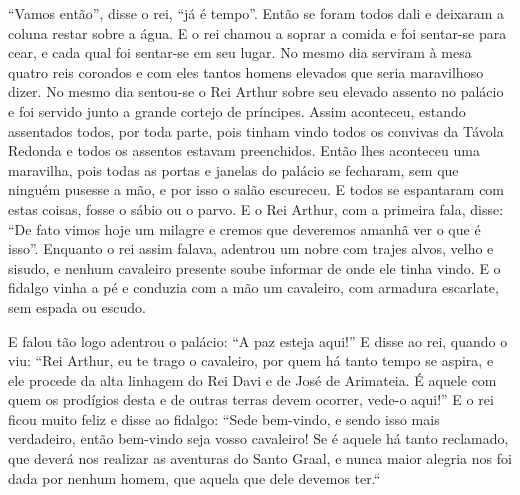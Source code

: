 “Vamos então”, disse o rei, “já é tempo”. Então se foram todos dali e deixaram a
coluna restar sobre a água. E o rei chamou a soprar a comida e foi sentar-se
para cear, e cada qual foi sentar-se em seu lugar. No mesmo dia serviram à mesa
quatro reis coroados e com eles tantos homens elevados que seria maravilhoso dizer.
No mesmo dia sentou-se o Rei Arthur sobre seu elevado assento no palácio e foi
servido junto a grande cortejo de príncipes. Assim aconteceu, estando
assentados todos, por toda parte, pois tinham vindo todos os convivas da Távola
Redonda e todos os assentos estavam preenchidos. Então lhes aconteceu uma
maravilha, pois todas as portas e janelas do palácio se fecharam, sem que
ninguém pusesse a mão, e por isso o salão escureceu. E todos se espantaram com
estas coisas, fosse o sábio ou o parvo. E o Rei Arthur, com a primeira fala,
disse: “De fato vimos hoje um milagre e cremos que deveremos amanhã ver o que é
isso”. Enquanto o rei assim falava, adentrou um nobre com trajes alvos, velho e
sisudo, e nenhum cavaleiro presente soube informar de onde ele tinha vindo. E o
fidalgo vinha a pé e conduzia com a mão um cavaleiro, com armadura escarlate,
sem espada ou escudo. 

E falou tão logo adentrou o palácio: “A paz esteja aqui!” E disse ao rei,
quando o viu: “Rei Arthur, eu te trago o cavaleiro, por quem há tanto tempo se
aspira, e ele procede da alta linhagem do Rei Davi e de José de Arimateia. É
aquele com quem os prodígios desta e de outras terras devem ocorrer, vede-o
aqui!” E o rei ficou muito feliz e disse ao fidalgo: “Sede bem-vindo, e sendo
isso mais verdadeiro, então bem-vindo seja vosso cavaleiro! Se é aquele há
tanto reclamado, que deverá nos realizar as aventuras do Santo Graal, e nunca
maior alegria nos foi dada por nenhum homem, que aquela que dele devemos ter.`` 

